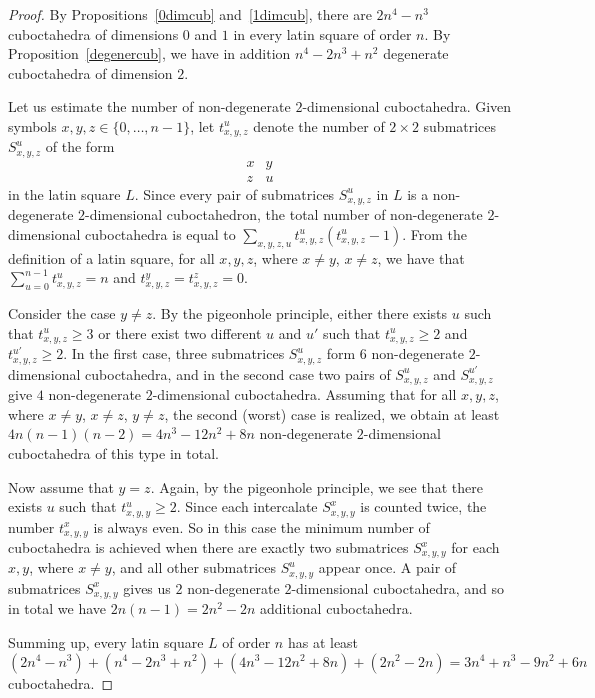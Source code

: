 \documentclass[10pt,a4paper]{amsart}
\begin{document}
\begin{proof}
By Propositions~\ref{0dimcub} and~\ref{1dimcub}, there are $2n^4 - n^3$ cuboctahedra of dimensions $0$ and $1$  in every latin square of order $n$.  By Proposition~\ref{degenercub}, we have in addition $n^4 - 2n^3 + n^2$ degenerate cuboctahedra of dimension $2$. 

Let us estimate the number of non-degenerate $2$-dimensional cuboctahedra. 
Given symbols $x,y,z \in \{ 0, \ldots, n-1\}$,  let  $t^u_{x,y,z}$ denote the number  of $2 \times 2$ submatrices $S^u_{x,y,z}$ of the form
$$
\begin{array}{cc}
 x & y \\ 
 z & u
\end{array}
$$
 in the latin square $L$.   Since every pair of submatrices  $S^u_{x,y,z}$  in $L$ is a non-degenerate $2$-dimensional cuboctahedron, the total number of non-degenerate $2$-dimensional cuboctahedra is  equal to $\sum\limits_{x,y,z,u} t^u_{x,y,z} (t^u_{x,y,z} - 1) $. 
 From the definition of a latin square,  for all $x,y,z$, where  $x \neq y$, $x \neq z$, we have  that $\sum\limits_{u=0}^{n-1} t^u_{x,y,z} = n $ and  $ t^y_{x,y,z} =  t^z_{x,y,z} = 0$.
 
Consider the case $y \neq z$. By the pigeonhole principle, either  there exists $u$ such that $ t^u_{x,y,z}  \geq 3 $ or there exist two different $u$ and $u'$ such that $ t^u_{x,y,z}  \geq 2$ and $ t^{u'}_{x,y,z}  \geq 2$. In the first case, three submatrices $S^u_{x,y,z}$  form $6$  non-degenerate $2$-dimensional cuboctahedra, and in the second case two pairs of $S^u_{x,y,z}$ and $S^{u'}_{x,y,z}$ give  $4$  non-degenerate $2$-dimensional cuboctahedra. Assuming that for all  $x,y,z$, where $x \neq y$, $x \neq z$, $y \neq z$, the second  (worst) case is realized, we obtain at least $4 n (n-1) (n-2) = 4 n^3 - 12n^2 + 8n$  non-degenerate $2$-dimensional  cuboctahedra  of this type in total. 
 
Now assume that $y = z$. Again, by the pigeonhole principle, we see that  there exists $u$ such that $ t^u_{x,y,y}  \geq 2 $.  Since each intercalate $S^x_{x,y,y}$ is counted twice, the number $t^x_{x,y,y}$ is always even.  So in this case the minimum number of cuboctahedra is achieved when there are exactly two submatrices  $S^x_{x,y,y}$  for each $x,y$, where $x \neq y$, and all other submatrices  $S^u_{x,y,y}$ appear once. A pair of submatrices  $S^x_{x,y,y}$   gives us $2$ non-degenerate $2$-dimensional cuboctahedra, and so in total we have $2 n (n-1) = 2n^2 - 2n$ additional cuboctahedra. 
 
 Summing up, every latin square $L$ of order $n$ has at least
 $$(2n^4 - n^3) + (n^4 - 2n^3 + n^2) + (4 n^3 - 12n^2 + 8n) + (2n^2 - 2n) = 3n^4 + n^3 - 9 n^2 + 6n$$
 cuboctahedra. 
 

\end{proof}
\end{document}
